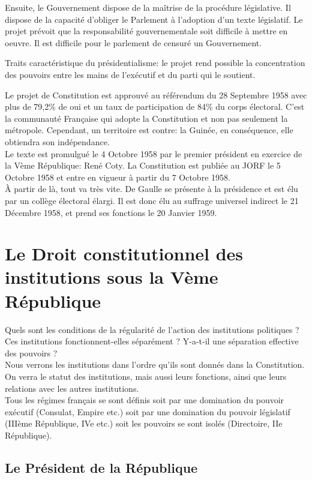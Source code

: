 \documentclass[12pt, a4paper, openany]{book}
\begin{document}
Ensuite, le Gouvernement dispose de la maîtrise de la procédure législative. Il dispose de la capacité d'obliger le Parlement à l'adoption d'un texte législatif. Le projet prévoit que la responsabilité gouvernementale soit difficile à mettre en oeuvre. Il est difficile pour le parlement de censuré un Gouvernement. 


Traits caractéristique du présidentialisme: le projet rend possible la concentration des pouvoirs entre les mains de l'exécutif et du parti qui le soutient.


Le projet de Constitution est approuvé au référendum du 28 Septembre 1958 avec plus de 79,2\% de oui et un taux de participation de 84\% du corps électoral. C'est la communauté Française qui adopte la Constitution et non pas seulement la métropole. Cependant, un territoire est contre: la Guinée, en conséquence, elle obtiendra son indépendance. \\
Le texte est promulgué le 4 Octobre 1958 par le premier président en exercice de la Vème République: René Coty. La Constitution est publiée au JORF le 5 Octobre 1958 et entre en vigueur à partir du 7 Octobre 1958. \\
À partir de là, tout va très vite. De Gaulle se présente à la présidence et est élu par un collège électoral élargi. Il est donc élu au suffrage universel indirect le 21 Décembre 1958, et prend ses fonctions le 20 Janvier 1959. 

\part{Le Droit constitutionnel des institutions sous la Vème République}

Quels sont les conditions de la régularité de l'action des institutions politiques ? \\
Ces institutions fonctionnent-elles séparément ? Y-a-t-il une séparation effective des pouvoirs ? \\
Nous verrons les institutions dans l'ordre qu'ils sont donnés dans la Constitution. On verra le statut des institutions, mais aussi leurs fonctions, ainsi que leurs relations avec les autres institutions. \\
Tous les régimes français se sont définis soit par une domination du pouvoir exécutif (Consulat, Empire etc.) soit par une domination du pouvoir législatif (IIIème République, IVe etc.) soit les pouvoirs se sont isolés (Directoire, IIe République). 

\chapter{Le Président de la République}
\end{document}

